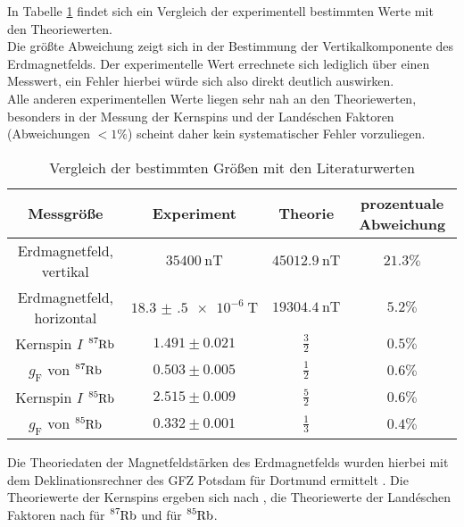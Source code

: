 In Tabelle \ref{tab:discuss} findet sich ein Vergleich der experimentell bestimmten Werte mit den Theoriewerten.\\
Die größte Abweichung zeigt sich in der Bestimmung der Vertikalkomponente des Erdmagnetfelds. Der experimentelle Wert errechnete sich lediglich über einen Messwert, ein Fehler hierbei würde sich also direkt deutlich auswirken.\\
Alle anderen experimentellen Werte liegen sehr nah an den Theoriewerten, besonders in der Messung der Kernspins und der Landéschen Faktoren (Abweichungen $<1\%$) scheint daher kein systematischer Fehler vorzuliegen.\\
\begin{table}
  \caption{Vergleich der bestimmten Größen mit den Literaturwerten}
  \label{tab:discuss}
 \centering
 \begin{tabular}{cccc}
   \toprule
Messgröße&Experiment&Theorie&prozentuale Abweichung\\
\midrule
Erdmagnetfeld, vertikal&$\SI{35400}{\nano\tesla}$&$\SI{45012.9}{\nano\tesla}$&$21.3\%$\\
Erdmagnetfeld, horizontal&$\SI{18.3(5)e-6}{\tesla}$&$\SI{19304.4}{\nano\tesla}$&$5.2\%$\\
Kernspin $I$ $\ce{^87Rb}$&$1.491\pm0.021$&$\frac{3}{2}$&$0.5\%$\\
$g_{\mathrm{F}}$ von $\ce{^87Rb}$&$0.503\pm0.005$&$\frac{1}{2}$&$0.6\%$\\
Kernspin $I$ $\ce{^85Rb}$&$2.515\pm0.009$&$\frac{5}{2}$&$0.6\%$\\
$g_{\mathrm{F}}$ von $\ce{^85Rb}$&$0.332\pm0.001$&$\frac{1}{3}$&$0.4\%$\\
\bottomrule
\end{tabular}
\end{table}
Die Theoriedaten der Magnetfeldstärken des Erdmagnetfelds wurden hierbei mit dem Deklinationsrechner des GFZ Potsdam für Dortmund ermittelt \cite{dekli}.
Die Theoriewerte der Kernspins ergeben sich nach \cite{muenster}, die Theoriewerte der Landéschen Faktoren nach \cite{gf} für $\ce{^87Rb}$ und \cite{gf2} für $\ce{^85Rb}$.
